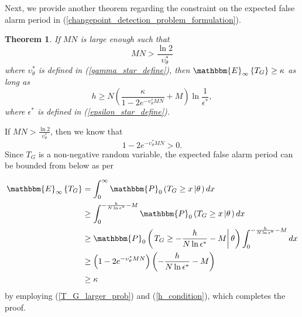 \documentclass[11pt, draftclsnofoot, onecolumn]{IEEEtran}
\newtheorem{theorem}{Theorem}
\newcommand{\bbE}{\mathbbm{E}}
\newcommand{\bbP}{\mathbbm{P}}
\begin{document}
Next, we provide another theorem regarding the constraint on the expected false alarm period in (\ref{changepoint_detection_problem_formulation}).
\begin{theorem} \label{Theorem_False_Alarm_Peroid}
	If $MN$ is large enough such that
	\begin{equation} \label{MN_constraint_corollary}
	MN > \frac{{\ln 2}}{{\upsilon _\theta ^*}}
	\end{equation}
	where ${\upsilon _\theta ^*}$ is defined in (\ref{gamma_star_define}), then ${\bbE_\infty }\left\{ {{T_G}} \right\} \ge \kappa$ as long as
	\begin{equation} \label{h_condition}
	h \ge N\left( {\frac{\kappa }{{1 - 2{e^{ - \upsilon _\theta ^*MN}}}} + M} \right)\ln \frac{1}{{{\epsilon ^*}}},
	\end{equation}
	where $\epsilon ^*$ is defined in (\ref{epsilon_star_define}).
\end{theorem}
\begin{IEEEproof}
	If $MN > \frac{{\ln 2}}{{\upsilon _\theta ^*}}$, then we know that 
	\begin{equation}
	{1 - 2{e^{ - \upsilon _\theta ^*MN}}} > 0.
	\end{equation}
Since $T_G$ is a non-negative random variable, the expected false alarm period can be bounded from below as per

\begin{align} \notag
{\bbE_\infty }\left\{ {{T_G}} \right\} & = \int_0^\infty  {{\bbP_0}\left( {{T_G} \ge x\left| \theta  \right.} \right)dx} \\ \notag
& \ge \int_0^{ - \frac{h}{{N\ln {\epsilon ^*}}} - M} {{\bbP_0}\left( {{T_G} \ge x\left| \theta  \right.} \right)dx} \\ \notag
& \ge {\bbP_0}\left( { \left. {T_G} \ge  - \frac{h}{{N\ln {\epsilon ^*}}} - M \right| \theta  } \right)\int_0^{ - \frac{h}{{N\ln {\epsilon ^*}}} - M} {dx} \\ \notag
& \ge \left( {1 - 2{e^{ - \upsilon _\theta ^*MN}}} \right)\left( { - \frac{h}{{N\ln {\epsilon ^*}}} - M} \right) \\
& \ge \kappa
\end{align}
by employing (\ref{T_G_larger_prob}) and (\ref{h_condition}), which completes the proof.
\end{IEEEproof}
\end{document}
